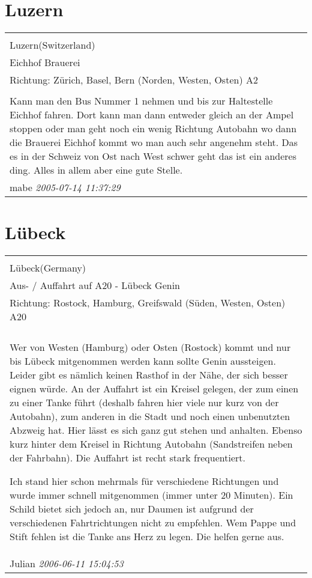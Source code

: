 \documentclass[a4paper,12pt]{article}
\begin{document}
\section{Luzern}
\begin{tabular}{|p{13cm}|}
\hline\\
Luzern(Switzerland)\\
Eichhof Brauerei\\
Richtung: Zürich, Basel, Bern (Norden, Westen, Osten) A2 \\
\hline\\
Kann man den Bus Nummer 1 nehmen und bis zur Haltestelle Eichhof fahren. Dort kann man dann entweder gleich an der Ampel stoppen oder man geht noch ein wenig Richtung Autobahn wo dann die Brauerei Eichhof kommt wo man auch sehr angenehm steht. Das es in der Schweiz von Ost nach West schwer geht das ist ein anderes ding. Alles in allem aber eine gute Stelle. \\
mabe \textit{ 2005-07-14 11:37:29 }\\\hline
\end{tabular}


\section{Lübeck}
\begin{tabular}{|p{13cm}|}
\hline\\
Lübeck(Germany)\\
Aus- / Auffahrt auf A20 - Lübeck Genin\\
Richtung: Rostock, Hamburg, Greifswald (Süden, Westen, Osten) A20 \\
\hline\\
Wer von Westen (Hamburg) oder Osten (Rostock) kommt und nur bis Lübeck mitgenommen werden kann sollte Genin aussteigen. Leider gibt es nämlich keinen Rasthof in der Nähe, der sich besser eignen würde. An der Auffahrt ist ein Kreisel gelegen, der zum einen zu einer Tanke führt (deshalb fahren hier viele nur kurz von der Autobahn), zum anderen in die Stadt und noch einen unbenutzten Abzweig hat. Hier lässt es sich ganz gut stehen und anhalten. Ebenso kurz hinter dem Kreisel in Richtung Autobahn (Sandstreifen neben der Fahrbahn). Die Auffahrt ist recht stark frequentiert.

Ich stand hier schon mehrmals für verschiedene Richtungen und wurde immer schnell mitgenommen (immer unter 20 Minuten). Ein Schild bietet sich jedoch an, nur Daumen ist aufgrund der verschiedenen Fahrtrichtungen nicht zu empfehlen. Wem Pappe und Stift fehlen ist die Tanke ans Herz zu legen. Die helfen gerne aus. \\
Julian \textit{ 2006-06-11 15:04:53 }\\\hline
\end{tabular}
\end{document}

